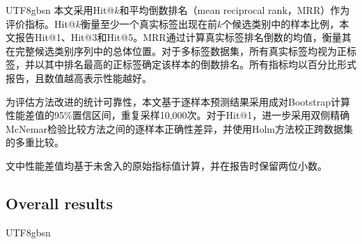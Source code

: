 \begin{CJK*}{UTF8}{gbsn}
本文采用Hit@$k$和平均倒数排名（mean reciprocal rank，MRR）作为评价指标。Hit@$k$衡量至少一个真实标签出现在前$k$个候选类别中的样本比例，本文报告Hit@1、Hit@3和Hit@5。MRR通过计算真实标签排名倒数的均值，衡量其在完整候选类别序列中的总体位置。对于多标签数据集，所有真实标签均视为正标签，并以其中排名最高的正标签确定该样本的倒数排名。所有指标均以百分比形式报告，且数值越高表示性能越好。

为评估方法改进的统计可靠性，本文基于逐样本预测结果采用成对Bootstrap计算性能差值的95\%置信区间，重复采样10,000次。对于Hit@1，进一步采用双侧精确McNemar检验比较方法之间的逐样本正确性差异，并使用Holm方法校正跨数据集的多重比较。

文中性能差值均基于未舍入的原始指标值计算，并在报告时保留两位小数。

\end{CJK*}

\subsection{Overall results}\label{sec:overall-results}
\begin{CJK*}{UTF8}{gbsn}






\end{CJK*}

